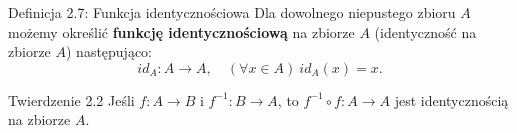 \documentclass{article}
\begin{document}
\begin{defr}{Definicja 2.7: Funkcja identycznościowa}
    Dla dowolnego niepustego zbioru $A$ możemy określić \textbf{funkcję identycznościową}
    na zbiorze $A$ (identyczność na zbiorze $A$) następująco:
    \begin{equation*}
        id_A:A\to A,\quad (\forall x\in A)\ id_A(x)=x.
    \end{equation*}
\end{defr}

\begin{twier}{Twierdzenie 2.2}
    Jeśli $f:A\to B$ i $f^{-1}:B\to A$, to $f^{-1}\circ f:A\to A$ jest identycznością na
    zbiorze $A$.
\end{twier}

























                                                
\end{document}
